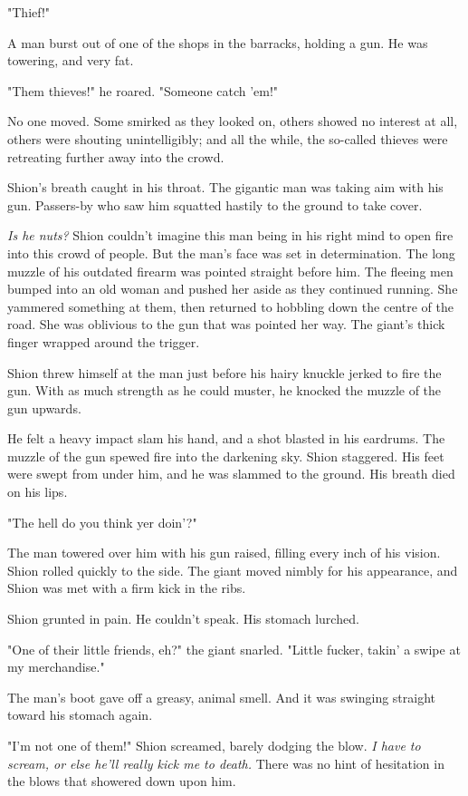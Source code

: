 "Thief!"

A man burst out of one of the shops in the barracks, holding a gun. He
was towering, and very fat.

"Them thieves!" he roared. "Someone catch 'em!"

No one moved. Some smirked as they looked on, others showed no interest
at all, others were shouting unintelligibly; and all the while, the
so-called thieves were retreating further away into the crowd.

Shion's breath caught in his throat. The gigantic man was taking aim
with his gun. Passers-by who saw him squatted hastily to the ground to
take cover.

\emph{Is he nuts?} Shion couldn't imagine this man being in his right mind to
open fire into this crowd of people. But the man's face was set in
determination. The long muzzle of his outdated firearm was pointed
straight before him. The fleeing men bumped into an old woman and pushed
her aside as they continued running. She yammered something at them,
then returned to hobbling down the centre of the road. She was oblivious
to the gun that was pointed her way. The giant's thick finger wrapped
around the trigger.

Shion threw himself at the man just before his hairy knuckle jerked to
fire the gun. With as much strength as he could muster, he knocked the
muzzle of the gun upwards.

He felt a heavy impact slam his hand, and a shot blasted in his
eardrums. The muzzle of the gun spewed fire into the darkening sky.
Shion staggered. His feet were swept from under him, and he was slammed
to the ground. His breath died on his lips.

"The hell do you think yer doin'?"

The man towered over him with his gun raised, filling every inch of his
vision. Shion rolled quickly to the side. The giant moved nimbly for his
appearance, and Shion was met with a firm kick in the ribs.

Shion grunted in pain. He couldn't speak. His stomach lurched.

"One of their little friends, eh?" the giant snarled. "Little fucker,
takin' a swipe at my merchandise."

The man's boot gave off a greasy, animal smell. And it was swinging
straight toward his stomach again.

"I'm not one of them!" Shion screamed, barely dodging the blow.\emph{ I have
	to scream, or else he'll really kick me to death.} There was no hint of
hesitation in the blows that showered down upon him.

